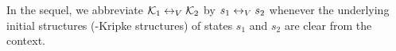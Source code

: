 \documentclass[letterpaper]{article} %
\begin{document}
 In the sequel, we abbreviate ${\cal K}_1 \leftrightarrow_V {\cal K}_2$
 by $s_1 \leftrightarrow_V s_2 $
 whenever the underlying initial structures (\Ind-Kripke structures) of states $s_1$ and $s_2$ are clear from the context.





\end{document}
